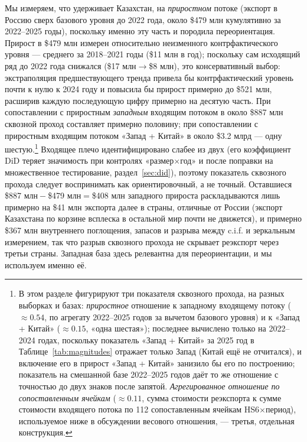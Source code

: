 \documentclass[12pt]{article}
\begin{document}
Мы измеряем, что удерживает Казахстан, на \emph{приростном} потоке (экспорт в Россию сверх
базового уровня до 2022 года, около \$479 млн кумулятивно за 2022--2025 годы), поскольку
именно эту часть и породила переориентация. Прирост в \$479 млн измерен относительно
неизменного контрфактического уровня — среднего за 2018--2021 годы (\$11 млн в год);
поскольку сам исходящий ряд до 2022 года снижался (\$17 млн$\to$\$8 млн), это консервативный
выбор: экстраполяция предшествующего тренда привела бы контрфактический уровень почти к
нулю к 2024 году и повысила бы прирост примерно до \$521 млн, расширив каждую последующую
цифру примерно на десятую часть. При сопоставлении с приростным \emph{западным} входящим
потоком в около \$887 млн сквозной проход составляет примерно половину; при сопоставлении с
приростным входящим потоком «Запад + Китай» в около \$3.2 млрд — одну шестую.\footnote{В
этом разделе фигурируют три показателя сквозного прохода, на разных выборках и базах:
\emph{приростное} отношение к западному входящему потоку ($\approx 0.54$, по агрегату
2022--2025 годов за вычетом базового уровня) и к «Запад + Китай» ($\approx 0.15$, «одна
шестая»); последнее вычислено только на 2022--2024 годах, поскольку показатель «Запад +
Китай» за 2025 год в Таблице~\ref{tab:magnitudes} отражает только Запад (Китай ещё не
отчитался), и включение его в прирост «Запад + Китай» занизило бы его по построению;
показатель на смешанной базе 2022--2025 годов даёт то же отношение с точностью до двух
знаков после запятой. \emph{Агрегированное отношение по сопоставленным ячейкам}
($\approx 0.11$, сумма стоимости реэкспорта к сумме стоимости входящего потока по 112
сопоставленным ячейкам HS6$\times$период), используемое ниже в обсуждении весового
отношения, — третья, отдельная конструкция.} Входящее плечо идентифицировано слабее из
двух (его коэффициент DiD теряет значимость при контролях «размер$\times$год» и после
поправки на множественное тестирование, раздел~\ref{sec:did}), поэтому показатель сквозного
прохода следует воспринимать как ориентировочный, а не точный. Оставшиеся
\$887 млн${}-{}$\$479 млн${}={}$\$408 млн западного прироста раскладываются лишь примерно на
\$41 млн экспорта далее в страны, отличные от России (экспорт Казахстана по корзине
всплеска в остальной мир почти не движется), и примерно \$367 млн внутреннего поглощения,
запасов и разрыва между c.i.f. и зеркальным измерением, так что разрыв сквозного прохода не
скрывает реэкспорт через третьи страны. Западная база здесь релевантна для переориентации, и
мы используем именно её.
\end{document}
